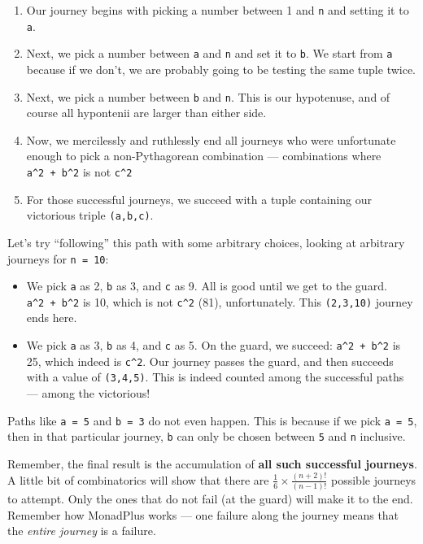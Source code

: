 \documentclass[]{article}
\begin{document}
\begin{enumerate}
\def\labelenumi{\arabic{enumi}.}
\tightlist
\item
  Our journey begins with picking a number between 1 and \texttt{n} and
  setting it to \texttt{a}.
\item
  Next, we pick a number between \texttt{a} and \texttt{n} and set it to
  \texttt{b}. We start from \texttt{a} because if we don't, we are
  probably going to be testing the same tuple twice.
\item
  Next, we pick a number between \texttt{b} and \texttt{n}. This is our
  hypotenuse, and of course all hypontenii are larger than either side.
\item
  Now, we mercilessly and ruthlessly end all journeys who were
  unfortunate enough to pick a non-Pythagorean combination ---
  combinations where \texttt{a\^{}2\ +\ b\^{}2} is not \texttt{c\^{}2}
\item
  For those successful journeys, we succeed with a tuple containing our
  victorious triple \texttt{(a,b,c)}.
\end{enumerate}

Let's try ``following'' this path with some arbitrary choices, looking
at arbitrary journeys for \texttt{n\ =\ 10}:

\begin{itemize}
\tightlist
\item
  We pick \texttt{a} as 2, \texttt{b} as 3, and \texttt{c} as 9. All is
  good until we get to the guard. \texttt{a\^{}2\ +\ b\^{}2} is 10,
  which is not \texttt{c\^{}2} (81), unfortunately. This
  \texttt{(2,3,10)} journey ends here.
\item
  We pick \texttt{a} as 3, \texttt{b} as 4, and \texttt{c} as 5. On the
  guard, we succeed: \texttt{a\^{}2\ +\ b\^{}2} is 25, which indeed is
  \texttt{c\^{}2}. Our journey passes the guard, and then succeeds with
  a value of \texttt{(3,4,5)}. This is indeed counted among the
  successful paths --- among the victorious!
\end{itemize}

Paths like \texttt{a\ =\ 5} and \texttt{b\ =\ 3} do not even happen.
This is because if we pick \texttt{a\ =\ 5}, then in that particular
journey, \texttt{b} can only be chosen between \texttt{5} and \texttt{n}
inclusive.

Remember, the final result is the accumulation of \textbf{all such
successful journeys}. A little bit of combinatorics will show that there
are \(\frac{1}{6} \times \frac{(n+2)!}{(n-1)!}\) possible journeys to
attempt. Only the ones that do not fail (at the guard) will make it to
the end. Remember how MonadPlus works --- one failure along the journey
means that the \emph{entire journey} is a failure.
\end{document}
